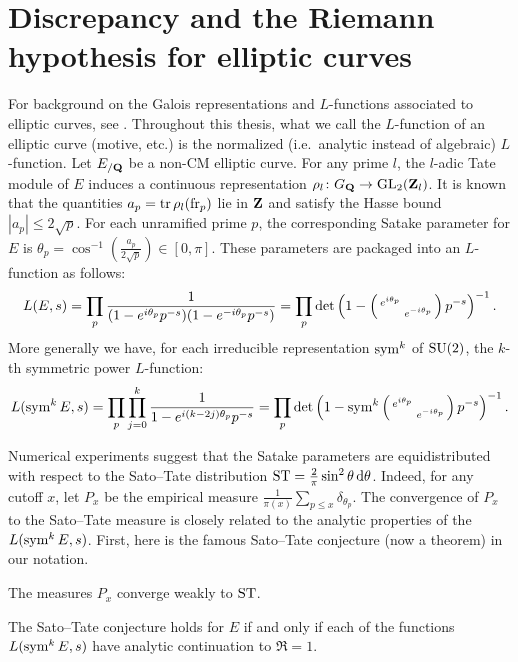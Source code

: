 \section{Discrepancy and the Riemann hypothesis for elliptic curves}

For background on the Galois representations and $L$-functions associated to 
elliptic curves, see \cite[III\S7, C\S17]{silverman-2009}. Throughout this 
thesis, what we call the $L$-function of an elliptic curve (motive, etc.) is 
the normalized (i.e.~analytic instead of algebraic) $L$-function. 
Let $E_{/\mathbf{Q}}$ be a non-CM elliptic curve. For any prime $l$, the $l$-adic Tate 
module of $E$ induces a continuous representation 
$\rho_l \colon G_{\mathbf{Q}} \to \operatorname{GL}_2(\mathbf{Z}_l)$. It is known that the quantities 
$a_p = \operatorname{tr} \rho_l(\mathrm{fr}_p)$ lie in $\mathbf{Z}$ and satisfy the Hasse bound 
$|a_p| \leqslant 2\sqrt p$. For each unramified prime $p$, the 
corresponding Satake parameter for $E$ is 
$\theta_p = \cos^{-1}\left(\frac{a_p}{2\sqrt p}\right) \in [0,\pi]$. 
These parameters are packaged into an $L$-function as follows:
\[
	L(E,s) = \prod_p \frac{1}{(1 - e^{i \theta_p} p^{-s})(1- e^{-i \theta_p} p^{-s})} = \prod_p \det\left(1 - \left(\begin{smallmatrix} e^{i\theta_p} &  \\  & e^{-i \theta_p} \end{smallmatrix}\right)p^{-s}\right)^{-1}.
\]
More generally we have, for each irreducible representation $\operatorname{sym}^k$ of 
$\operatorname{SU}(2)$, the $k$-th symmetric power $L$-function: 
\[
	L(\operatorname{sym}^k E, s) = \prod_p \prod_{j=0}^k \frac{1}{1 - e^{i (k - 2j) \theta_p} p^{-s}} = \prod_p \det\left(1-\operatorname{sym}^k \left(\begin{smallmatrix} e^{i\theta_p} &  \\  & e^{-i \theta_p} \end{smallmatrix}\right)p^{-s}\right)^{-1}.
\]

Numerical experiments suggest that the Satake parameters are equidistributed 
with respect to the Sato--Tate distribution 
$\mathrm{ST} = \frac{2}{\pi} \sin^2\theta\, \mathrm{d}\theta$. Indeed, for any cutoff $x$, let 
$P_x$ be the empirical measure 
$\frac{1}{\pi(x)} \sum_{p\leqslant x} \delta_{\theta_p}$. 
The convergence of $P_x$ to the Sato--Tate measure is closely related to 
the analytic properties of the $L(\operatorname{sym}^k E,s)$. First, here is the famous 
Sato--Tate conjecture (now a theorem) in our notation. 

\begin{theorem}[Taylor et.~al.]
The measures $P_x$ converge weakly to $\mathrm{ST}$. 
\end{theorem}

\begin{theorem}[Serre]
The Sato--Tate conjecture holds for $E$ if and only if each of 
the functions $L(\operatorname{sym}^k E,s)$ have analytic continuation to $\Re = 1$. 
\end{theorem}

